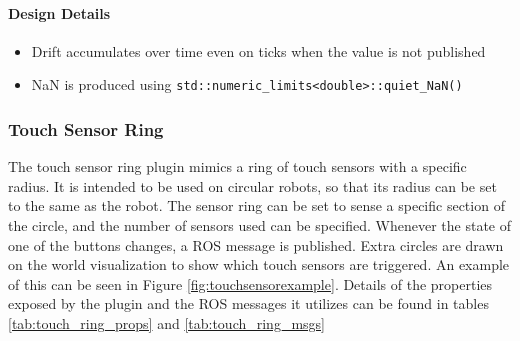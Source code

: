 \begin{itemize}
\paragraph{Design Details}
\begin{itemize}
	\item Drift accumulates over time even on ticks when the value is not published
	\item NaN is produced using \lstinline|std::numeric_limits<double>::quiet_NaN()|
\end{itemize}

\subsubsection*{Touch Sensor Ring}
The touch sensor ring plugin mimics a ring of touch sensors with a specific radius. It is intended to be used on circular robots, so that its radius can be set to the same as the robot. 
	The sensor ring can be set to sense a specific section of the circle, and the number of sensors used can be specified. Whenever the state of one of the buttons changes, a ROS message is published. Extra circles are drawn on the world visualization to show which touch sensors are triggered. An example of this can be seen in Figure \ref{fig:touchsensorexample}. Details of the properties exposed by the plugin and the ROS messages it utilizes can be found in tables \ref{tab:touch_ring_props} and \ref{tab:touch_ring_msgs}
	

\end{itemize}

